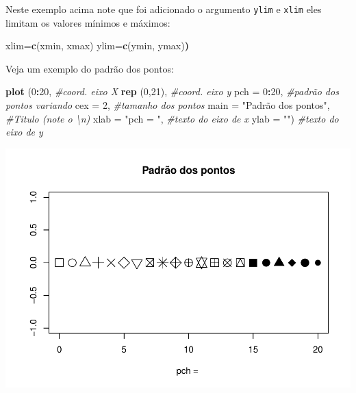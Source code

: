 \documentclass[
]{book}
\newenvironment{Shaded}{\begin{snugshade}}{\end{snugshade}}
\newcommand{\CommentTok}[1]{\textcolor[rgb]{0.56,0.35,0.01}{\textit{#1}}}
\newcommand{\DataTypeTok}[1]{\textcolor[rgb]{0.13,0.29,0.53}{#1}}
\newcommand{\DecValTok}[1]{\textcolor[rgb]{0.00,0.00,0.81}{#1}}
\newcommand{\ErrorTok}[1]{\textcolor[rgb]{0.64,0.00,0.00}{\textbf{#1}}}
\newcommand{\KeywordTok}[1]{\textcolor[rgb]{0.13,0.29,0.53}{\textbf{#1}}}
\newcommand{\NormalTok}[1]{#1}
\newcommand{\OperatorTok}[1]{\textcolor[rgb]{0.81,0.36,0.00}{\textbf{#1}}}
\newcommand{\StringTok}[1]{\textcolor[rgb]{0.31,0.60,0.02}{#1}}
\begin{document}
Neste exemplo acima note que foi adicionado o argumento \texttt{ylim} e \texttt{xlim} eles limitam os valores mínimos e máximos:

\begin{Shaded}
\begin{Highlighting}[]
\NormalTok{xlim=}\KeywordTok{c}\NormalTok{(xmin, xmax) ylim=}\KeywordTok{c}\NormalTok{(ymin, ymax)}\ErrorTok{)}
\end{Highlighting}
\end{Shaded}

Veja um exemplo do padrão dos pontos:

\begin{Shaded}
\begin{Highlighting}[]
\KeywordTok{plot}\NormalTok{ (}\DecValTok{0}\OperatorTok{:}\DecValTok{20}\NormalTok{,                         }\CommentTok{#coord. eixo X}
      \KeywordTok{rep}\NormalTok{ (}\DecValTok{0}\NormalTok{,}\DecValTok{21}\NormalTok{),                   }\CommentTok{#coord. eixo y}
      \DataTypeTok{pch =} \DecValTok{0}\OperatorTok{:}\DecValTok{20}\NormalTok{,                   }\CommentTok{#padrão dos pontos variando}
      \DataTypeTok{cex =} \DecValTok{2}\NormalTok{,                      }\CommentTok{#tamanho dos pontos}
      \DataTypeTok{main =} \StringTok{"Padrão dos pontos"}\NormalTok{, }\CommentTok{#Titulo (note o \textbackslash{}n)}
      \DataTypeTok{xlab =} \StringTok{"pch = "}\NormalTok{,              }\CommentTok{#texto do eixo de x}
      \DataTypeTok{ylab =} \StringTok{""}\NormalTok{)                    }\CommentTok{#texto do eixo de y}
\end{Highlighting}
\end{Shaded}

\includegraphics{TudodoR_files/figure-latex/unnamed-chunk-157-1.pdf}
\end{document}
